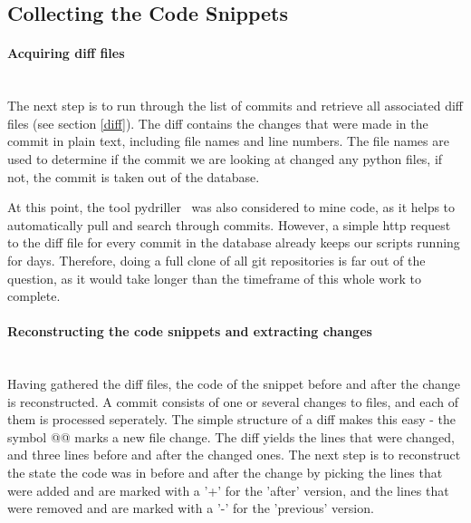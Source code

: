 \documentclass[
	a4paper,
	pagesize,
	pdftex,
	12pt,
	twoside, %
	BCOR=5mm, %
	ngerman,
	fleqn,
	final,
	]{scrartcl}
\begin{document}
\subsection{Collecting the Code Snippets}
\paragraph{Acquiring diff files}\mbox{}\\
The next step is to run through the list of commits and retrieve all associated diff files (see section \ref{diff}). The diff contains the changes that were made in the commit in plain text, including file names and line numbers. The file names are used to determine if the commit we are looking at changed any python files, if not, the commit is taken out of the database.

At this point, the tool pydriller~\cite{Spadini.2018} was also considered to mine code, as it helps to automatically pull and search through commits. However, a simple http request to the diff file for every commit in the database already keeps our scripts running for days. Therefore, doing a full clone of all git repositories is far out of the question, as it would take longer than the timeframe of this whole work to complete.



\paragraph{Reconstructing the code snippets and extracting changes}\mbox{}\\
Having gathered the diff files, the code of the snippet before and after the change is reconstructed. A commit consists of one or several changes to files, and each of them is processed seperately. The simple structure of a diff makes this easy - the symbol @@ marks a new file change. The diff yields the lines that were changed, and three lines before and after the changed ones.  The next step is to reconstruct the state the code was in before and after the change by picking the lines that were added and are marked with a '+' for the 'after' version, and the lines that were removed and are marked with a '-' for the 'previous' version. 
\end{document}
